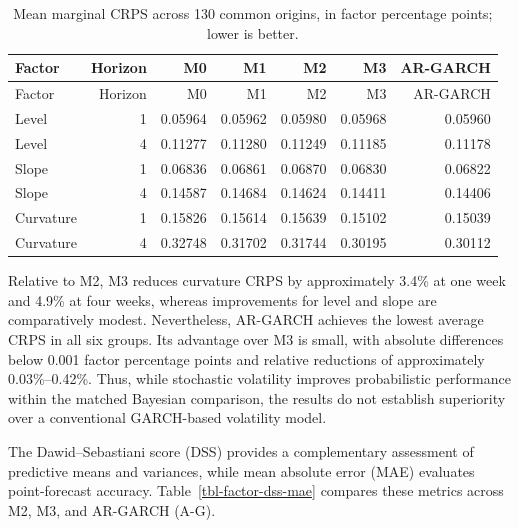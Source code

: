 \documentclass[
  12pt,
  letterpaper,
  DIV=11,
  numbers=noendperiod]{scrreprt}
\begin{document}
\begin{longtable}[]{@{}lrrrrrr@{}}
\caption{Mean marginal CRPS across 130 common origins, in factor
percentage points; lower is
better.}\label{tbl-factor-crps}\tabularnewline
\toprule\noalign{}
Factor & Horizon & M0 & M1 & M2 & M3 & AR-GARCH \\
\midrule\noalign{}
\endfirsthead
\toprule\noalign{}
Factor & Horizon & M0 & M1 & M2 & M3 & AR-GARCH \\
\midrule\noalign{}
\endhead
\bottomrule\noalign{}
\endlastfoot
Level & 1 & 0.05964 & 0.05962 & 0.05980 & 0.05968 & 0.05960 \\
Level & 4 & 0.11277 & 0.11280 & 0.11249 & 0.11185 & 0.11178 \\
Slope & 1 & 0.06836 & 0.06861 & 0.06870 & 0.06830 & 0.06822 \\
Slope & 4 & 0.14587 & 0.14684 & 0.14624 & 0.14411 & 0.14406 \\
Curvature & 1 & 0.15826 & 0.15614 & 0.15639 & 0.15102 & 0.15039 \\
Curvature & 4 & 0.32748 & 0.31702 & 0.31744 & 0.30195 & 0.30112 \\
\end{longtable}

Relative to M2, M3 reduces curvature CRPS by approximately 3.4\% at one
week and 4.9\% at four weeks, whereas improvements for level and slope
are comparatively modest. Nevertheless, AR-GARCH achieves the lowest
average CRPS in all six groups. Its advantage over M3 is small, with
absolute differences below 0.001 factor percentage points and relative
reductions of approximately 0.03\%--0.42\%. Thus, while stochastic
volatility improves probabilistic performance within the matched
Bayesian comparison, the results do not establish superiority over a
conventional GARCH-based volatility model.

The Dawid--Sebastiani score (DSS) provides a complementary assessment of
predictive means and variances, while mean absolute error (MAE)
evaluates point-forecast accuracy. Table~\ref{tbl-factor-dss-mae}
compares these metrics across M2, M3, and AR-GARCH (A-G).
\end{document}
